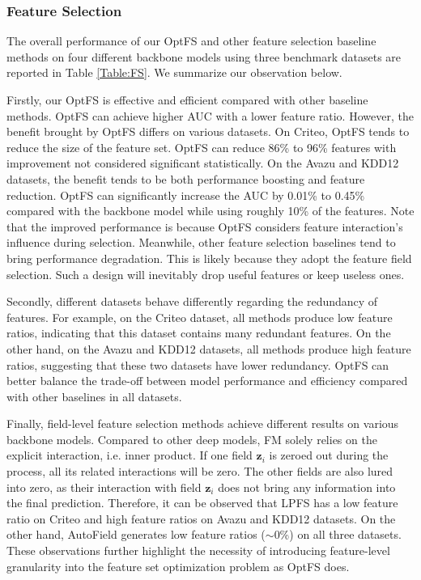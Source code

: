 \documentclass[sigconf]{acmart}
\begin{document}
\subsubsection{Feature Selection}
\label{sec:experiment_fs}
The overall performance of our OptFS and other feature selection baseline methods on four different backbone models using three benchmark datasets are reported in Table \ref{Table:FS}. We summarize our observation below.

Firstly, our OptFS is effective and efficient compared with other baseline methods. OptFS can achieve higher AUC with a lower feature ratio. However, the benefit brought by OptFS differs on various datasets. On Criteo, OptFS tends to reduce the size of the feature set. OptFS can reduce 86\% to 96\% features with improvement not considered significant statistically. On the Avazu and KDD12 datasets, the benefit tends to be both performance boosting and feature reduction. OptFS can significantly increase the AUC by 0.01\% to 0.45\% compared with the backbone model while using roughly 10\% of the features. Note that the improved performance is because OptFS considers feature interaction's influence during selection.
Meanwhile, other feature selection baselines tend to bring performance degradation. This is likely because they adopt the feature field selection. Such a design will inevitably drop useful features or keep useless ones.

Secondly, different datasets behave differently regarding the redundancy of features. For example, on the Criteo dataset, all methods produce low feature ratios, indicating that this dataset contains many redundant features. On the other hand, on the Avazu and KDD12 datasets, all methods produce high feature ratios, suggesting that these two datasets have lower redundancy. 
OptFS can better balance the trade-off between model performance and efficiency compared with other baselines in all datasets.



Finally, field-level feature selection methods achieve different results on various backbone models. Compared to other deep models, FM solely relies on the explicit interaction, i.e. inner product. If one field $\mathbf{z}_i$ is zeroed out during the process, all its related interactions will be zero. The other fields are also lured into zero, as their interaction with field $\mathbf{z}_i$ does not bring any information into the final prediction. Therefore, it can be observed that LPFS has a low feature ratio on Criteo and high feature ratios on Avazu and KDD12 datasets. On the other hand, AutoField generates low feature ratios ($\sim$0\%) on all three datasets. These observations further highlight the necessity of introducing feature-level granularity into the feature set optimization problem as OptFS does. 
\end{document}
